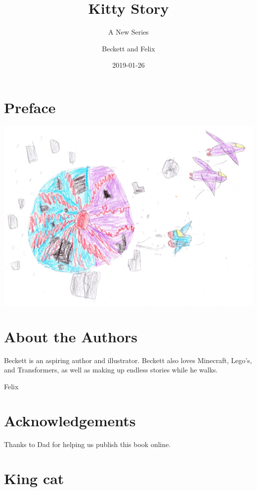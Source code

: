 \documentclass[12pt,oneside]{krantz}
\title{Kitty Story}
\subtitle{A New Series}
\author{Beckett and Felix}
\date{2019-01-26}
\begin{document}
\maketitle

{
\setcounter{tocdepth}{1}
\tableofcontents
}
\hypertarget{preface}{%
\chapter*{Preface}\label{preface}}


\includegraphics{img/catplanet.jpg}

\hypertarget{about-the-authors}{%
\chapter*{About the Authors}\label{about-the-authors}}


Beckett is an aspiring author and illustrator. Beckett also loves
Minecraft, Lego's, and Transformers, as well as making up endless
stories while he walks.

Felix

\hypertarget{acknowledgements}{%
\chapter*{Acknowledgements}\label{acknowledgements}}


Thanks to Dad for helping us publish this book online.

\hypertarget{king-cat}{%
\chapter{King cat}\label{king-cat}}
\end{document}
